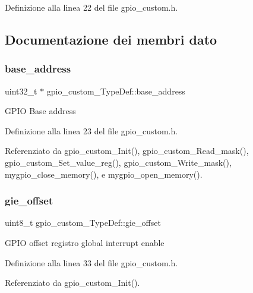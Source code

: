 Definizione alla linea 22 del file gpio\+\_\+custom.\+h.



\subsection{Documentazione dei membri dato}
\mbox{\label{structgpio__custom___type_def_ad27f63e553c421cfd3f4353e44e2730c}} 
\subsubsection{\texorpdfstring{base\+\_\+address}{base\_address}}
{\footnotesize\ttfamily uint32\+\_\+t $\ast$ gpio\+\_\+custom\+\_\+\+Type\+Def\+::base\+\_\+address}

G\+P\+IO Base address 

Definizione alla linea 23 del file gpio\+\_\+custom.\+h.



Referenziato da gpio\+\_\+custom\+\_\+\+Init(), gpio\+\_\+custom\+\_\+\+Read\+\_\+mask(), gpio\+\_\+custom\+\_\+\+Set\+\_\+value\+\_\+reg(), gpio\+\_\+custom\+\_\+\+Write\+\_\+mask(), mygpio\+\_\+close\+\_\+memory(), e mygpio\+\_\+open\+\_\+memory().

\mbox{\label{structgpio__custom___type_def_acfe1beb8be446fbf8cf25f972f8d94bc}} 
\subsubsection{\texorpdfstring{gie\+\_\+offset}{gie\_offset}}
{\footnotesize\ttfamily uint8\+\_\+t gpio\+\_\+custom\+\_\+\+Type\+Def\+::gie\+\_\+offset}

G\+P\+IO offset registro global interrupt enable 

Definizione alla linea 33 del file gpio\+\_\+custom.\+h.



Referenziato da gpio\+\_\+custom\+\_\+\+Init().

